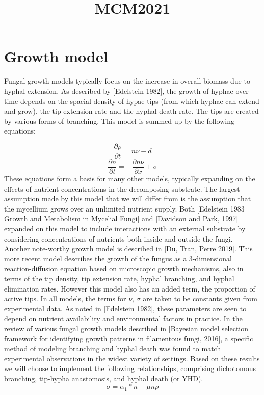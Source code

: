 \documentclass[10pt]{article}
\title{MCM2021}
\begin{document}
\maketitle

\section*{Growth model}
Fungal growth models typically focus on the increase in overall biomass due to hyphal extension. As described by [Edelstein 1982], the growth of hyphae over time depends on the spacial density of hypae tips (from which hyphae can extend and grow), the tip extension rate and the hyphal death rate. The tips are created by various forms of branching. This model is summed up by the following equations:

\begin{equation} \label {eq}
    \frac{\partial \rho}{\partial t} = n\nu - d
\end{equation}
\begin{equation} \label {eq}
    \frac{\partial n}{\partial t} = -\frac{\partial n\nu}{\partial x} + \sigma
\end{equation}
These equations form a basis for many other models, typically expanding on the effects of nutrient concentrations in the decomposing substrate. The largest assumption made by this model that we will differ from is the assumption that the mycellium grows over an unlimited nutrient supply. Both [Edelstein 1983 Growth and Metabolism in Mycelial Fungi] and [Davidson and Park, 1997] expanded on this model to include interactions with an external substrate by considering concentrations of nutrients both inside and outside the fungi. 
\\ Another note-worthy growth model is described in [Du, Tran, Perre 2019]. This more recent model describes the growth of the fungus as a 3-dimensional reaction-diffusion equation based on microscopic growth mechanisms, also in terms of the tip density, tip extension rate, hyphal branching, and hyphal elimination rates. However this model also has an added term, the proportion of active tips. In all models, the terms for $\nu$, $\sigma$ are taken to be constants given from experimental data. As noted in [Edelstein 1982], these parameters are seen to depend on nutrient availability and environmental factors in practice. In the review of various fungal growth models described in [Bayesian model selection framework for identifying growth patterns in filamentous fungi, 2016], a specific method of modeling branching and hyphal death was found to match experimental observations in the widest variety of settings. Based on these results we will choose to implement the following relationships, comprising dichotomous branching, tip-hypha anastomosis, and hyphal death (or YHD). 
\begin{equation} \label {eq}
    \sigma = \alpha_{1}*n - \mu n \rho
\end{equation}
\end{document}
